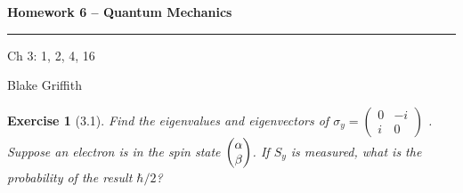 
\usepackage{amsfonts, amsmath, amsthm}

\setlength{\parskip}{1ex}
\setlength{\parindent}{0pt}

\newtheorem*{exer}{Exercise}

\newcommand{\floor}{\text{floor }}
\newcommand{\img}{\text{img }}
\newcommand{\lcm}{\text{lcm }}
\newcommand{\aut}{\text{Aut }}
\newcommand{\cycle}[1]{(\mathbf{#1})}



\textbf{Homework 6 -- Quantum Mechanics} \\

\hrule

\begin{minipage}{.80\linewidth}
    \flushleft
    Ch 3: 1, 2, 4, 16 \\
\end{minipage}
\begin{minipage}{.20\linewidth}
    \flushright
    Blake Griffith
\end{minipage}


\begin{exer}[3.1]

    Find the eigenvalues and eigenvectors of 
    $\sigma_y = \begin{pmatrix}
        0 & -i \\ 
        i & 0
    \end{pmatrix}$
    . Suppose an electron is in the spin state $
    \begin{pmatrix} \alpha \\ \beta \end{pmatrix} $. If $S_y$ is measured, what is the
    probability of the result $\hbar / 2$?


\end{exer}

